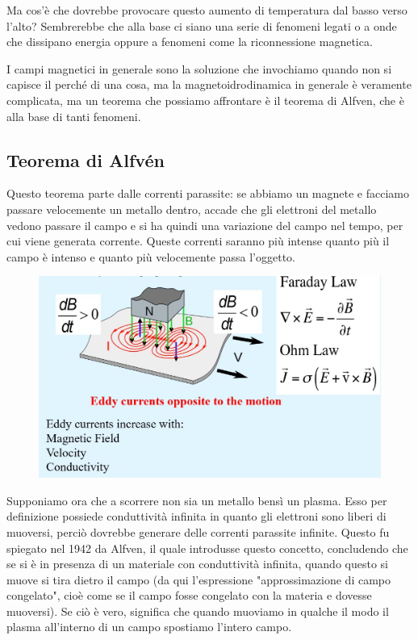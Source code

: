 Ma cos'è che dovrebbe provocare questo aumento di temperatura dal basso verso l'alto? Sembrerebbe che alla base ci siano una serie di fenomeni legati o a onde che dissipano energia oppure a fenomeni come la riconnessione magnetica.

I campi magnetici in generale sono la soluzione che invochiamo quando non si capisce il perché di una cosa, ma la magnetoidrodinamica in generale è veramente complicata, ma un teorema che possiamo affrontare è il teorema di Alfven, che è alla base di tanti fenomeni.

\subsection{Teorema di Alfvén}
Questo teorema parte dalle correnti parassite: se abbiamo un magnete e facciamo passare velocemente un metallo dentro, accade che gli elettroni del metallo vedono passare il campo e si ha quindi una variazione del campo nel tempo, per cui viene generata corrente. Queste correnti saranno più intense quanto più il campo è intenso e quanto più velocemente passa l'oggetto.

\begin{figure}[H]
    \centering
    \includegraphics[width=14cm]{Correnti parassite.JPG}
\end{figure}

Supponiamo ora che a scorrere non sia un metallo bensì un plasma. Esso per definizione possiede conduttività infinita in quanto gli elettroni sono liberi di muoversi, perciò dovrebbe generare delle correnti parassite infinite. Questo fu spiegato nel 1942 da Alfven, il quale introdusse questo concetto, concludendo che se si è in presenza di un materiale con conduttività infinita, quando questo si muove si tira dietro il campo (da qui l'espressione "approssimazione di campo congelato", cioè come se il campo fosse congelato con la materia e dovesse muoversi). Se ciò è vero, significa che quando muoviamo in qualche il modo il plasma all'interno di un campo spostiamo l'intero campo.

